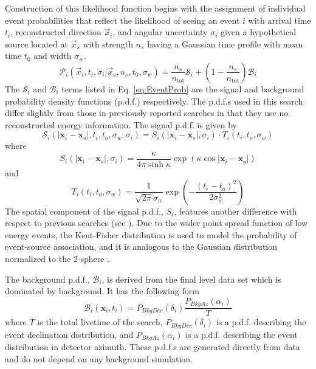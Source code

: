 \documentclass[manuscript]{aastex}
\begin{document}
Construction of this likelihood function begins with the assignment of individual event probabilities that reflect the likelihood of seeing an event $i$ with arrival time $t_i$, reconstructed direction $\vec{x}_i$, and angular uncertainty $\sigma_i$ given a hypothetical source located at $\vec{x}_s$ with strength $n_s$ having a Gaussian time profile with mean time $t_0$ and width $\sigma_w$.
\begin{equation}\label{eq:EventProb}
\mathcal{P}_i(\vec{x}_i,t_i,\sigma_i|\vec{x}_s,n_s,t_0,\sigma_w) = \frac{n_s}{n_{\mathrm{tot}}} \mathcal{S}_i + \left(1-\frac{n_s}{n_{\mathrm{tot}}}\right) \mathcal{B}_i
\end{equation}
The $\mathcal{S}_i$ and $\mathcal{B}_i$ terms listed in Eq. \ref{eq:EventProb} are the signal and background probability density functions (p.d.f.) respectively. The p.d.f.s used in this search differ slightly from those in previously reported searches in that they use no reconstructed energy information. The signal p.d.f. is given by
\begin{equation}
\mathcal{S}_i(|\mathbf{x}_i-\mathbf{x}_s|,t_i,t_o,\sigma_w,\sigma_i) = S_i(|\mathbf{x}_i-\mathbf{x}_s|,\sigma_i) \cdot T_i(t_i,t_o,\sigma_w)
\end{equation}
where
\begin{equation}
S_i(|\mathbf{x}_i-\mathbf{x}_s|,\sigma_i) = \frac{\kappa}{4\pi \sinh \kappa} \exp \left(\kappa \cos |\mathbf{x}_i-\mathbf{x_s}|\right)
\end{equation}
and
\begin{equation}
T_i(t_i,t_o,\sigma_w) = \frac{1}{\sqrt{2\pi}\sigma_w} \exp \left(-\frac{(t_i-t_o)^2}{2 \sigma_w^2}\right)
\end{equation}
The spatial component of the signal p.d.f., $S_i$, features another difference with respect to previous searches (see \cite{2014ApJ...796..109A}). Due to the wider point spread function of low energy events, the Kent-Fisher distribution is used to model the probability of event-source association, and it is analogous to the Gaussian distribution normalized to the 2-sphere \citep{Fisher_Bingham}.

The background p.d.f., $\mathcal{B}_i$, is derived from the final level data set which is dominated by background. It has the following form
\begin{equation}
\mathcal{B}_i(\mathbf{x}_i,t_i) = P_{BkgDec}(\delta_i)\frac{P_{BkgAz}(\alpha_i)}{T}
\end{equation}
where $T$ is the total livetime of the search, $P_{BkgDec}(\delta_i)$ is a p.d.f. describing the event declination distribution, and $P_{BkgAz}(\alpha_i)$ is a p.d.f. describing the event distribution in detector azimuth. These p.d.f.s are generated directly from data and do not depend on any background simulation.
\end{document}
